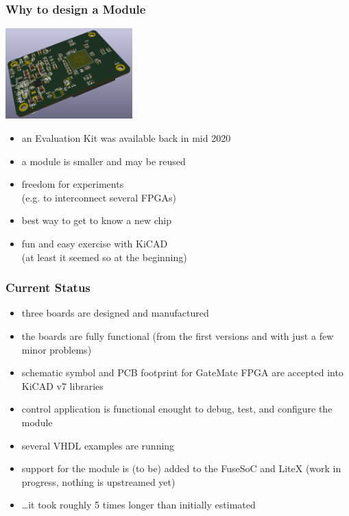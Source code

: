 \begin{frame}
  \frametitle{Why to design a Module}

  \begin{flushright}
    \includegraphics[height=3.5cm]{GMM-7550_preview_2020-10-01.png}
  \end{flushright}
  \vspace{-4cm}

  \begin{minipage}{9cm}
  \begin{itemize}
    \item an Evaluation Kit was available back in mid 2020
    \item a module is smaller and may be reused
    \item freedom for experiments\\(e.g. to interconnect several FPGAs)
    \item best way to get to know a new chip
    \item fun and easy exercise with KiCAD\\(at least it seemed so at the beginning)
  \end{itemize}
  \end{minipage}

\end{frame}

\begin{frame}
  \frametitle{Current Status}
  \begin{itemize}
    \item three boards are designed and manufactured
    \item the boards are fully functional (from the first versions and
    with just a few minor problems)
    \item schematic symbol and PCB footprint for GateMate FPGA are accepted
    into KiCAD v7 libraries
    \item control application is functional enought to debug, test,
    and configure the module
    \item several VHDL examples are running
    \item support for the module is (to be) added to the FuseSoC and LiteX
    (work in progress, nothing is upstreamed yet)
    \item \dots it took roughly 5 times longer than initially estimated
  \end{itemize}
\end{frame}

